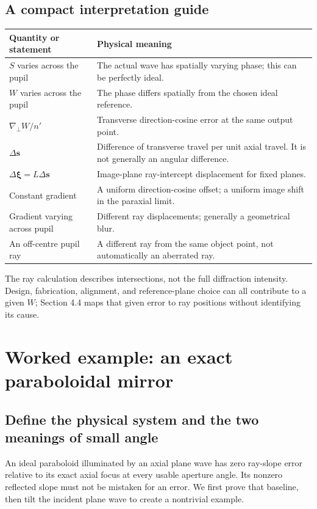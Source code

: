 \documentclass[11pt,a4paper]{article}
\numberwithin{equation}{section}
\newcommand{\gradp}{\nabla_{\!\perp}}
\newcommand{\vct}[1]{\bm{#1}}
\begin{document}
\subsection{A compact interpretation guide}
\begin{center}
\begin{tabularx}{\textwidth}{@{}p{}Y@{}}
\toprule
Quantity or statement & Physical meaning\\ \midrule
$S$ varies across the pupil & The actual wave has spatially varying phase; this can be perfectly ideal.\\
$W$ varies across the pupil & The phase differs spatially from the chosen ideal reference.\\
$\gradp W/n'$ & Transverse direction-cosine error at the same output point.\\
$\Delta\vct s$ & Difference of transverse travel per unit axial travel. It is not generally an angular difference.\\
$\Delta\vct\xi=L\Delta\vct s$ & Image-plane ray-intercept displacement for fixed planes.\\
Constant gradient & A uniform direction-cosine offset; a uniform image shift in the paraxial limit.\\
Gradient varying across pupil & Different ray displacements; generally a geometrical blur.\\
An off-centre pupil ray & A different ray from the same object point, not automatically an aberrated ray.\\
\bottomrule
\end{tabularx}
\end{center}
The ray calculation describes intersections, not the full diffraction
intensity. Design, fabrication, alignment, and reference-plane choice can
all contribute to a given $W$; Section 4.4 maps that given error to ray
positions without identifying its cause.

\clearpage
\section{Worked example: an exact paraboloidal mirror}
\label{sec:paraboloid}
\subsection{Define the physical system and the two meanings of small angle}
An ideal paraboloid illuminated by an axial plane wave has zero ray-slope
error relative to its exact axial focus at every usable aperture angle.
Its nonzero reflected slope must not be mistaken for an error.
We first prove that baseline, then tilt the incident plane wave to create
a nontrivial example.
\end{document}
